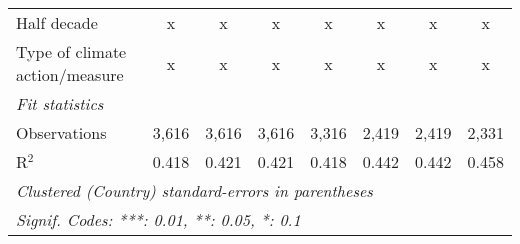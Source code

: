 \begin{tabular}{lccccccc}
   Half decade                                                                                       & x             & x             & x             & x             & x             & x            & x\\  
   Type of climate action/measure                                                                    & x             & x             & x             & x             & x             & x            & x\\  
   \midrule \emph{Fit statistics}\\
   Observations                                                                                      & 3,616         & 3,616         & 3,616         & 3,316         & 2,419         & 2,419        & 2,331\\  
   R$^2$                                                                                             & 0.418         & 0.421         & 0.421         & 0.418         & 0.442         & 0.442        & 0.458\\  
   \midrule
   \multicolumn{8}{l}{\emph{Clustered (Country) standard-errors in parentheses}}\\
   \multicolumn{8}{l}{\emph{Signif. Codes: ***: 0.01, **: 0.05, *: 0.1}}\\
\end{tabular}
\par\endgroup


